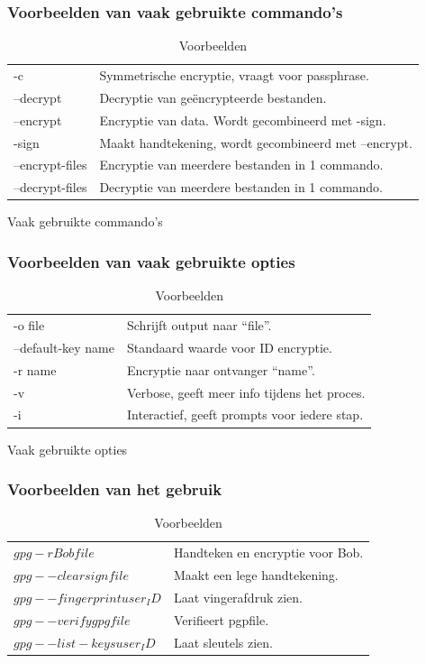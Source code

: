 \documentclass[12pt]{article}
\begin{document}
				\subsubsection{Voorbeelden van vaak gebruikte commando's}\label{com}
					\begin{table}[!ht] \cite{Commando}
						\begin{tabular}{l|l}
								-c				&	Symmetrische encryptie, vraagt voor passphrase\index{Passphrase}.\\
								--decrypt			&	Decryptie\index{Decryptie} van ge\"encrypteerde bestanden.\\
								--encrypt			&	Encryptie van data. Wordt gecombineerd met -sign.\\
								-sign				&	Maakt handtekening, wordt gecombineerd met --encrypt.\\
								--encrypt-files	&	Encryptie van meerdere bestanden in 1 commando.\\
								--decrypt-files	&	Decryptie van meerdere bestanden in 1 commando.\\
						\end{tabular}
						\caption{Vaak gebruikte commando's}						
					
				\subsubsection{Voorbeelden van vaak gebruikte opties}\label{opt}\cite{Commando}					
						\begin{tabular}{l|l}
								-o file				&	Schrijft output naar \textquotedblleft file\textquotedblright.\\
								--default-key name	&	Standaard waarde voor ID encryptie.\\
								-r name				&	Encryptie naar ontvanger \textquotedblleft name\textquotedblright.\\
								-v					&	Verbose\index{Verbose}, geeft meer info tijdens het proces.\\
								-i					&	Interactief, geeft prompts\index{Prompts} voor iedere stap.\\
						\end{tabular}\caption{Vaak gebruikte opties}
											
				\subsubsection{Voorbeelden van het gebruik}\label{use}\cite{Commando}
						\begin{tabular}{l|l}
								$gpg -r Bob file$				&	Handteken en encryptie voor Bob.\\
								$gpg --clearsign file$			&	Maakt een lege handtekening\index{Handtekening}.\\
								$gpg --fingerprint user_ID$		&	Laat vingerafdruk zien.\\
								$gpg --verify gpgfile$			&	Verifieert pgpfile.\\
								$gpg --list-keys user_ID$		&	Laat sleutels zien.\\
						\end{tabular}
						\caption{Voorbeelden}
					\end{table}	
				\cite{Tabellen}
			
\end{document}
